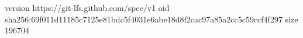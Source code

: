 version https://git-lfs.github.com/spec/v1
oid sha256:69f011d11185c7125e81bdc5f4031e6abe18d8f2cac97a85a2cc5c59ccf4f297
size 196704
